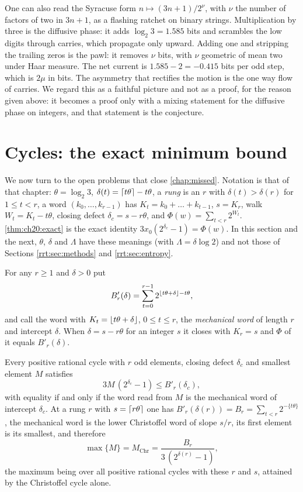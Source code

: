 One can also read the Syracuse form $n\mapsto(3n+1)/2^{\nu}$, with $\nu$ the number of factors of two in $3n+1$, as a flashing ratchet on binary strings. Multiplication by three is the diffusive phase: it adds $\log_2 3=1.585$ bits and scrambles the low digits through carries, which propagate only upward. Adding one and stripping the trailing zeros is the pawl: it removes $\nu$ bits, with $\nu$ geometric of mean two under Haar measure. The net current is $1.585-2=-0.415$ bits per odd step, which is $2\mu$ in bits. The asymmetry that rectifies the motion is the one way flow of carries. We regard this as a faithful picture and not as a proof, for the reason given above: it becomes a proof only with a mixing statement for the diffusive phase on integers, and that statement is the conjecture.


\section{Cycles: the exact minimum bound}\label{rrt:sec:exact}

We now turn to the open problems that close \cref{chap:missed}. Notation is that of that chapter: $\theta=\log_2 3$, $\delta(t)=\lceil t\theta\rceil-t\theta$, a \emph{rung} is an $r$ with $\delta(t)>\delta(r)$ for $1\le t<r$, a word $(k_0,\dots,k_{r-1})$ has $K_t=k_0+\dots+k_{t-1}$, $s=K_r$, walk $W_t=K_t-t\theta$, closing defect $\delta_c=s-r\theta$, and $\Phi(w)=\sum_{t<r}2^{W_t}$. \cref{thm:ch20:exact} is the exact identity $3x_0(2^{\delta_c}-1)=\Phi(w)$. In this section and the next, $\theta$, $\delta$ and $\Lambda$ have these meanings (with $\Lambda=\delta\log 2$) and not those of Sections \ref{rrt:sec:methods} and \ref{rrt:sec:entropy}.


For any $r\ge 1$ and $\delta>0$ put
\[
B'_r(\delta)=\sum_{t=0}^{r-1}2^{\lfloor t\theta+\delta\rfloor-t\theta},
\]
and call the word with $K_t=\lfloor t\theta+\delta\rfloor$, $0\le t\le r$, the \emph{mechanical word} of length $r$ and intercept $\delta$. When $\delta=s-r\theta$ for an integer $s$ it closes with $K_r=s$ and $\Phi$ of it equals $B'_r(\delta)$.

\begin{theorem}\label{rrt:thm:exact}
Every positive rational cycle with $r$ odd elements, closing defect $\delta_c$ and smallest element $M$ satisfies
\[
3M\,(2^{\delta_c}-1)\le B'_r(\delta_c),
\]
with equality if and only if the word read from $M$ is the mechanical word of intercept $\delta_c$. At a rung $r$ with $s=\lceil r\theta\rceil$ one has $B'_r(\delta(r))=B_r=\sum_{t<r}2^{-\{t\theta\}}$, the mechanical word is the lower Christoffel word of slope $s/r$, its first element is its smallest, and therefore
\[
\max\{M\}=M_{\mathrm{Chr}}=\frac{B_r}{3\,(2^{\delta(r)}-1)},
\]
the maximum being over all positive rational cycles with these $r$ and $s$, attained by the Christoffel cycle alone.
\end{theorem}

